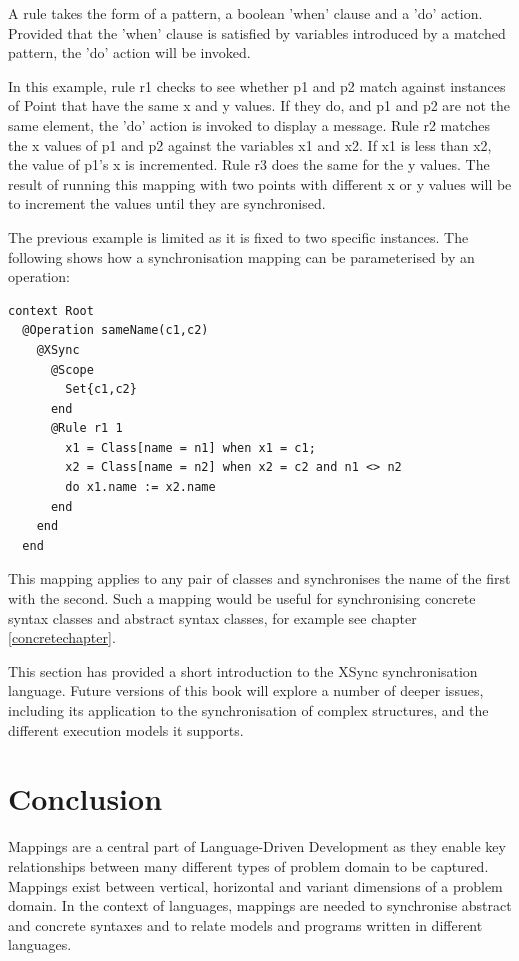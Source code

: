 A rule takes the form of a pattern, a boolean 'when' clause and a
'do' action. Provided that the 'when' clause is satisfied by
variables introduced by a matched pattern, the 'do' action will be
invoked.

In this example, rule r1 checks to see whether p1 and p2 match
against instances of Point that have the same x and y values. If
they do, and  p1 and p2 are not the same element, the 'do' action
is invoked to display a message. Rule r2 matches the x values of
p1 and p2 against the variables x1 and x2. If x1 is less than x2,
the value of p1's x is incremented. Rule r3 does the same for the
y values. The result of running this mapping with two points with
different x or y values will be to increment the values until they
are synchronised.

The previous example is limited as it is fixed to two specific
instances. The following shows how a synchronisation mapping can
be parameterised by an operation:

\begin{lstlisting}
context Root
  @Operation sameName(c1,c2)
    @XSync
      @Scope
        Set{c1,c2}
      end
      @Rule r1 1
        x1 = Class[name = n1] when x1 = c1;
        x2 = Class[name = n2] when x2 = c2 and n1 <> n2
        do x1.name := x2.name
      end
    end
  end
\end{lstlisting}This mapping applies to any pair of classes and synchronises the
name of the first with the second. Such a mapping would be useful
for synchronising concrete syntax classes and abstract syntax
classes, for example see chapter \ref{concretechapter}.

This section has provided a short introduction to the XSync
synchronisation language. Future versions of this book will
explore a number of deeper issues, including its application to
the synchronisation of complex structures, and the different
execution models it supports.

\section{Conclusion}

Mappings are a central part of Language-Driven Development as they
enable key relationships between many different types of problem
domain to be captured. Mappings exist between vertical, horizontal
and variant dimensions of a problem domain. In the context of
languages, mappings are needed to synchronise abstract and
concrete syntaxes and to relate models and programs written in
different languages.
